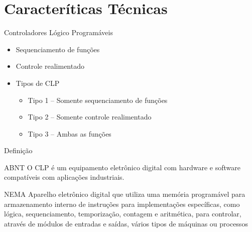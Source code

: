 \documentclass[aspectratio=169,
				xcolor=table]{beamer}
\begin{document}
	\section{Caracteríticas Técnicas}
	\begin{frame}{Controladores Lógico Programáveis}
		\begin{itemize}
			\item Sequenciamento de funções 
			\vspace{1em}
			\item Controle realimentado
			\vspace{1em}
			\item Tipos de CLP
			\begin{itemize}
				\item Tipo 1 – Somente sequenciamento de funções
				\item Tipo 2 – Somente controle realimentado
				\item Tipo 3 – Ambas as funções
			\end{itemize}
		\end{itemize}
	\end{frame}
	
	\begin{frame}{Definição}
		\begin{block}{ABNT}
			O CLP é um equipamento eletrônico digital com  hardware e  software compatíveis com aplicações industriais.
		\end{block}

		\begin{block}{NEMA}
			Aparelho  eletrônico  digital  que  utiliza  uma  memória programável  para armazenamento  interno  de  instruções  para  implementações  específicas,  como  lógica, sequenciamento, temporização, contagem e aritmética, para controlar, através de módulos de entradas e saídas, vários tipos de máquinas ou processos

		\end{block}
	\end{frame}
	
\end{document}
